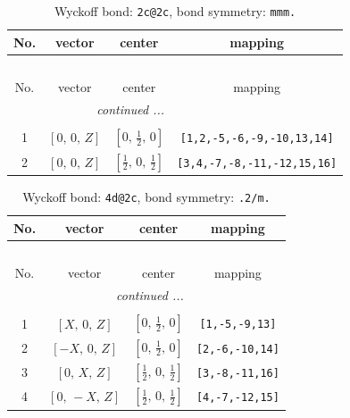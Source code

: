 \documentclass[fleqn,8pt]{jsarticle}
\begin{document}
\begin{longtable}{cccc}
\caption{Wyckoff bond: {\tt 2c@2c}, bond symmetry: {\tt mmm.}}
 \\
 \hline \hline
No. & vector & center & mapping \\ \hline \endfirsthead

\multicolumn{3}{l}{\tablename\ \thetable{}} \\
 \hline \hline
No. & vector & center & mapping \\ \hline \endhead

 \hline \hline
\multicolumn{3}{r}{\footnotesize\it continued ...} \\ \endfoot

 \hline \hline
\multicolumn{3}{r}{} \\ \endlastfoot

1 & $\left[ 0,\, 0,\, Z \right]$ & $\left[ 0,\, \frac{1}{2},\, 0 \right]$ & {\tt [1,2,-5,-6,-9,-10,13,14]} \\ \hline
2 & $\left[ 0,\, 0,\, Z \right]$ & $\left[ \frac{1}{2},\, 0,\, \frac{1}{2} \right]$ & {\tt [3,4,-7,-8,-11,-12,15,16]} \\
\end{longtable}
\renewcommand{\arraystretch}{1.2}
\begin{longtable}{cccc}
\caption{Wyckoff bond: {\tt 4d@2c}, bond symmetry: {\tt .2/m.}}
 \\
 \hline \hline
No. & vector & center & mapping \\ \hline \endfirsthead

\multicolumn{3}{l}{\tablename\ \thetable{}} \\
 \hline \hline
No. & vector & center & mapping \\ \hline \endhead

 \hline \hline
\multicolumn{3}{r}{\footnotesize\it continued ...} \\ \endfoot

 \hline \hline
\multicolumn{3}{r}{} \\ \endlastfoot

1 & $\left[ X,\, 0,\, Z \right]$ & $\left[ 0,\, \frac{1}{2},\, 0 \right]$ & {\tt [1,-5,-9,13]} \\ \hline
2 & $\left[ - X,\, 0,\, Z \right]$ & $\left[ 0,\, \frac{1}{2},\, 0 \right]$ & {\tt [2,-6,-10,14]} \\ \hline
3 & $\left[ 0,\, X,\, Z \right]$ & $\left[ \frac{1}{2},\, 0,\, \frac{1}{2} \right]$ & {\tt [3,-8,-11,16]} \\ \hline
4 & $\left[ 0,\, - X,\, Z \right]$ & $\left[ \frac{1}{2},\, 0,\, \frac{1}{2} \right]$ & {\tt [4,-7,-12,15]} \\
\end{longtable}
\end{document}
